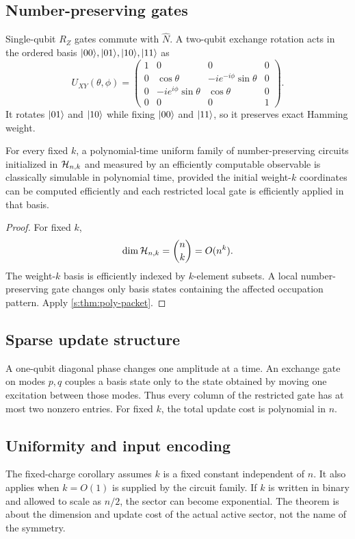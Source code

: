 \subsection{Number-preserving gates}
Single-qubit $R_Z$ gates commute with $\widehat N$. A two-qubit exchange rotation acts in the ordered basis $\lvert 00\rangle,\lvert 01\rangle,\lvert 10\rangle,\lvert 11\rangle$ as
\[
U_{XY}(\theta,\phi)
=
\begin{pmatrix}
1&0&0&0\\
0&\cos\theta&-ie^{-i\phi}\sin\theta&0\\
0&-ie^{i\phi}\sin\theta&\cos\theta&0\\
0&0&0&1
\end{pmatrix}.
\]
It rotates $\lvert 01\rangle$ and $\lvert 10\rangle$ while fixing $\lvert 00\rangle$ and $\lvert 11\rangle$, so it preserves exact Hamming weight.

\begin{corollary}
\label{s:cor:fixed-charge-poly}
For every fixed $k$, a polynomial-time uniform family of number-preserving circuits initialized in $\mathcal H_{n,k}$ and measured by an efficiently computable observable is classically simulable in polynomial time, provided the initial weight-$k$ coordinates can be computed efficiently and each restricted local gate is efficiently applied in that basis.
\end{corollary}

\begin{proof}
For fixed $k$,
\[
\dim\mathcal H_{n,k}=\binom nk=O(n^k).
\]
The weight-$k$ basis is efficiently indexed by $k$-element subsets. A local number-preserving gate changes only basis states containing the affected occupation pattern. Apply \cref{s:thm:poly-packet}.
\end{proof}

\subsection{Sparse update structure}
A one-qubit diagonal phase changes one amplitude at a time. An exchange gate on modes $p,q$ couples a basis state only to the state obtained by moving one excitation between those modes. Thus every column of the restricted gate has at most two nonzero entries. For fixed $k$, the total update cost is polynomial in $n$.

\subsection{Uniformity and input encoding}
The fixed-charge corollary assumes $k$ is a fixed constant independent of $n$. It also applies when $k=O(1)$ is supplied by the circuit family. If $k$ is written in binary and allowed to scale as $n/2$, the sector can become exponential. The theorem is about the dimension and update cost of the actual active sector, not the name of the symmetry.

